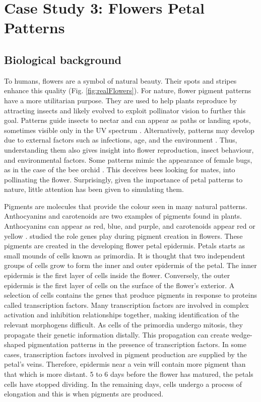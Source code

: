 \chapter{Case Study 3: Flowers Petal Patterns}

\section{Biological background}
To humans, flowers are a symbol of natural beauty. Their spots and stripes enhance this quality (Fig. \ref{fig:realFlowers}). For nature, flower pigment patterns have a more utilitarian purpose. They are used to help plants reproduce by attracting insects and likely evolved to exploit pollinator vision to further this goal. Patterns guide insects to nectar and can appear as paths or landing spots, sometimes visible only in the UV spectrum \citep{davies2012}. Alternatively, patterns may develop due to external factors such as infections, age, and the environment \citep{davies2012, robinson2015}. Thus, understanding them also gives insight into flower reproduction, insect behaviour, and environmental factors. Some patterns mimic the appearance of female bugs, as in the case of the bee orchid \citep{vereecken7484}. This deceives bees looking for mates, into pollinating the flower. Surprisingly, given the importance of petal patterns to nature, little attention has been given to simulating them.

Pigments are molecules that provide the colour seen in many natural patterns. Anthocyanins and carotenoids are two examples of pigments found in plants. Anthocyanins can appear as red, blue, and purple, and carotenoids appear red or yellow \citep{bayer1966}. \citet{martin1993} studied the role genes play during pigment creation in flowers. These pigments are created in the developing flower petal epidermis. Petals starts as small mounds of cells known as primordia. It is thought that two independent groups of cells grow to form the inner and outer epidermis of the petal. The inner epidermis is the first layer of cells inside the flower. Conversely, the outer epidermis is the first layer of cells on the surface of the flower's exterior. A selection of cells contains the genes that produce pigments in response to proteins called transcription factors. Many transcription factors are involved in complex activation and inhibition relationships together, making identification of the relevant morphogens difficult. As cells of the primordia undergo mitosis, they propagate their genetic information distally. This propagation can create wedge-shaped pigmentation patterns in the presence of transcription factors. In some cases, transcription factors involved in pigment production are supplied by the petal's veins. Therefore, epidermis near a vein will contain more pigment than that which is more distant. 5 to 6 days before the flower has matured, the petals cells have stopped dividing. In the remaining days, cells undergo a process of elongation and this is when pigments are produced.

